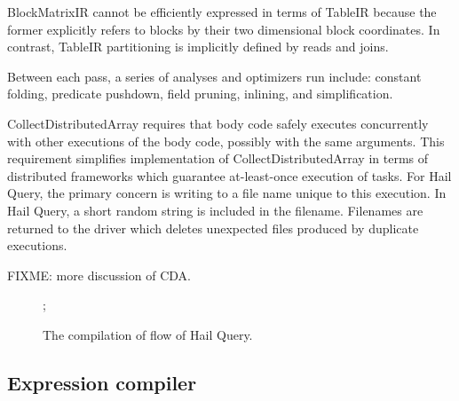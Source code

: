 \documentclass[sigconf, nonacm]{acmart}
\begin{document}
BlockMatrixIR cannot be efficiently expressed in terms of TableIR because the former explicitly
refers to blocks by their two dimensional block coordinates. In contrast, TableIR partitioning is
implicitly defined by reads and joins.

Between each pass, a series of analyses and optimizers run include: constant folding, predicate
pushdown, field pruning, inlining, and simplification.







CollectDistributedArray requires that body code safely executes concurrently with other executions
of the body code, possibly with the same arguments. This requirement simplifies implementation of
CollectDistributedArray in terms of distributed frameworks which guarantee at-least-once execution
of tasks. For Hail Query, the primary concern is writing to a file name unique to this execution. In
Hail Query, a short random string is included in the filename. Filenames are returned to the driver
which deletes unexpected files produced by duplicate executions.

FIXME: more discussion of CDA.

\begin{figure}[h]
  ;
  \caption{The compilation of flow of Hail Query.}
  \label{fig:compilation-of-languages}
\end{figure}

\subsection{Expression compiler}
\end{document}
